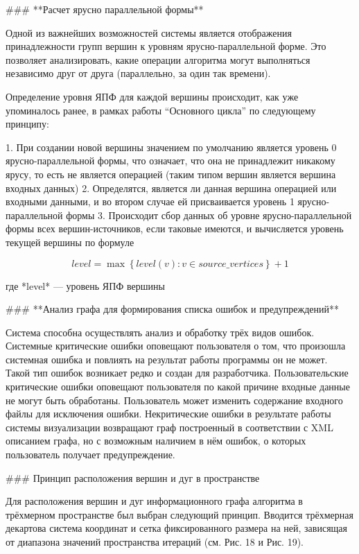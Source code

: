 ### **Расчет ярусно параллельной формы**

Одной из важнейших возможностей системы является отображения принадлежности групп вершин к уровням ярусно-параллельной форме. Это позволяет анализировать, какие операции алгоритма могут выполняться независимо друг от друга (параллельно, за один так времени).

Определение уровня ЯПФ для каждой вершины происходит, как уже упоминалось ранее, в рамках работы “Основного цикла” по следующему принципу:

1. При создании новой вершины значением по умолчанию является уровень 0 ярусно-параллельной формы, что означает, что она не принадлежит никакому ярусу, то есть не является операцией (таким типом вершин является вершина входных данных)
2. Определятся, является ли данная вершина операцией или входными данными, и во втором случае ей присваивается уровень 1 ярусно-параллельной формы
3. Происходит сбор данных об уровне ярусно-параллельной формы всех вершин-источников, если таковые имеются, и вычисляется уровень текущей вершины по формуле
    
    $$
    level = \max\left\{level(v): v \in source\_vertices\right\} + 1
    $$
    
    где *level* — уровень ЯПФ вершины
    

### **Анализ графа для формирования списка ошибок и предупреждений**

Система способна осуществлять анализ и обработку трёх видов ошибок. Системные критические ошибки оповещают пользователя о том, что произошла системная ошибка и повлиять на результат работы программы он не может. Такой тип ошибок возникает редко и создан для разработчика. Пользовательские критические ошибки оповещают пользователя по какой причине входные данные не могут быть обработаны. Пользователь может изменить содержание входного файлы для исключения ошибки. Некритические ошибки в результате работы системы визуализации возвращают граф построенный в соответствии с XML описанием графа, но с возможным наличием в нём ошибок, о которых пользователь получает предупреждение. 

### Принцип расположения вершин и дуг в пространстве

Для расположения вершин и дуг информационного графа алгоритма в трёхмерном пространстве был выбран следующий принцип. Вводится трёхмерная декартова система координат и сетка фиксированного размера на ней, зависящая от диапазона значений пространства итераций (см. Рис. 18 и Рис. 19).

